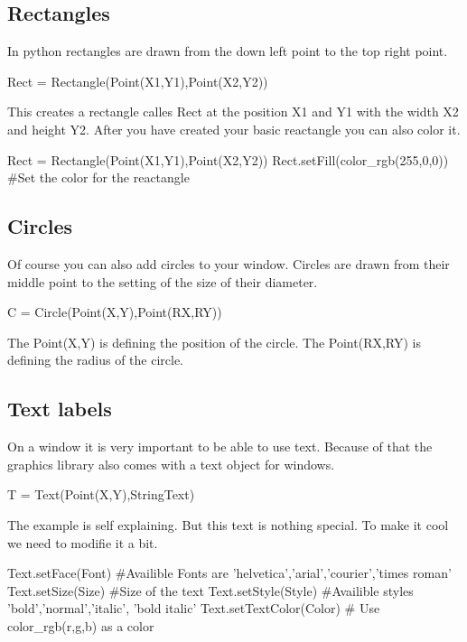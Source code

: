 \subsection{Rectangles}
In python rectangles are drawn from the down left point to the top right point.
\begin{python}
Rect = Rectangle(Point(X1,Y1),Point(X2,Y2))
\end{python}
This creates a rectangle calles Rect at the position X1 and Y1 with the width X2 and height Y2. 
After you have created your basic reactangle you can also color it.
\begin{fullwidth}
\begin{python}
Rect = Rectangle(Point(X1,Y1),Point(X2,Y2))
Rect.setFill(color_rgb(255,0,0)) #Set the color for the reactangle
\end{python}
\end{fullwidth}
\subsection{Circles}
Of course you can also add circles to your window. Circles are drawn from their middle point to the setting of the size of their diameter.
\begin{python}
C = Circle(Point(X,Y),Point(RX,RY))
\end{python}
The Point(X,Y) is defining the position of the circle. The Point(RX,RY) is defining the radius of the circle.

\subsection{Text labels}
On a window it is very important to be able to use text. Because of that the graphics library also comes with a text object for windows.
\begin{python}
T = Text(Point(X,Y),StringText)
\end{python}
The example is self explaining. But this text is nothing special. To make it cool we need to modifie it a bit.
\begin{fullwidth}
\begin{python}
Text.setFace(Font)
 #Availible Fonts are 'helvetica','arial','courier','times roman'
Text.setSize(Size) #Size of the text
Text.setStyle(Style)
 #Availible styles 'bold','normal','italic', 'bold italic'
Text.setTextColor(Color) # Use color_rgb(r,g,b) as a color
\end{python}
\end{fullwidth}

